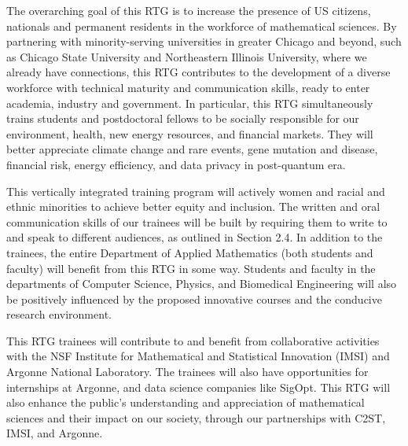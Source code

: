 \documentclass[11pt]{NSFamsart}
\begin{document}
The overarching goal of this RTG is to increase the presence of US citizens, nationals and permanent residents in the workforce of  mathematical sciences. 
By partnering with minority-serving  universities in greater Chicago and beyond, such as   Chicago State University and Northeastern Illinois University, where we already have connections, this RTG   contributes to  the development of a diverse    workforce with technical maturity and communication skills, ready to enter academia, industry and government. In particular, this RTG simultaneously trains students and postdoctoral fellows to be socially responsible for our environment, health, new energy resources, and financial markets.  They will  better appreciate climate change and rare events, gene mutation and disease, financial risk, energy efficiency, and data privacy in post-quantum era.   
   

This vertically integrated training program will actively women  and racial and ethnic minorities to achieve better equity and inclusion.  The written and oral communication skills of our trainees will be built by requiring them to write to and speak to different audiences, as outlined in Section 2.4. 
In addition to the trainees, the entire Department of Applied Mathematics (both students and faculty) will benefit from this RTG in some way. Students and faculty in the departments of Computer Science, Physics, and Biomedical Engineering will also be positively influenced by the proposed innovative courses %
and the conducive research environment. 
 
This RTG trainees will contribute to and benefit from collaborative activities with the NSF Institute for Mathematical and Statistical Innovation (IMSI) and Argonne National Laboratory. The trainees will also have opportunities for internships at Argonne,  and data science companies like SigOpt. This RTG will also enhance the public’s understanding and appreciation of mathematical sciences and their impact on our society, through our partnerships with C2ST, IMSI, and Argonne.  
 
\end{document}

